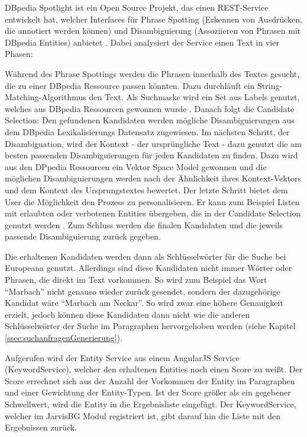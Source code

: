   DBpedia Spotlight ist ein Open Source Projekt, das einen REST-Service entwickelt hat, welcher Interfaces für Phrase Spotting (Erkennen von Ausdrücken, die annotiert werden können) und Disambiguierung (Assoziieren von Phrasen mit DBpedia Entities) anbietet \cite{daiber2013improving}. Dabei analysiert der Service einen Text in vier Phasen:

  Während des Phrase Spottings werden die Phrasen innerhalb des Textes gesucht, die zu einer DBpedia Ressource passen könnten. Dazu durchläuft ein String-Matching-Algorithmus den Text. Als Suchmaske wird ein Set aus Labels genutzt, welches aus DBpedia Ressourcen gewonnen wurde \cite{mendes2011dbpedia}. Danach folgt die Candidate Selection: Den gefundenen Kandidaten werden mögliche Disambiguierungen aus dem DBpedia Lexikalisierungs Datensatz zugewiesen. Im nächsten Schritt, der Disambiguation, wird der Kontext - der ursprüngliche Text - dazu genutzt die am besten passenden Disambiguierungen für jeden Kandidaten zu finden. Dazu wird aus den DPpedia Ressourcen ein Vektor Space Model gewonnen und die möglichen Disambiguierungen werden nach der Ähnlichkeit ihres Kontext-Vektors und dem Kontext des Ursprungstextes bewertet. Der letzte Schritt bietet dem User die Möglichkeit den Prozess zu personalisieren. Er kann zum Beispiel Listen mit erlaubten oder verbotenen Entities übergeben, die in der Candidate Selection genutzt werden \cite{mendes2011dbpedia}. Zum Schluss werden die finalen Kandidaten und die jeweils passende Disambiguierung zurück gegeben. 

  Die erhaltenen Kandidaten werden dann als Schlüsselwörter für die Suche bei Europeana genutzt. Allerdings sind diese Kandidaten nicht immer Wörter oder Phrasen, die direkt im Text vorkommen. So wird zum Beispiel das Wort ``Marbach'' nicht genauso wieder zurück gesendet, sondern der dazugehörige Kandidat wäre ``Marbach am Neckar''. So wird zwar eine höhere Genauigkeit erzielt, jedoch können diese Kandidaten dann nicht wie die anderen Schlüsselwörter der Suche im Paragraphen hervorgehoben werden (siehe Kapitel \ref{ssec:suchanfragenGenerierung}).
 
  Aufgerufen wird der Entity Service aus einem AngularJS Service (KeywordService), welcher den erhaltenen Entities noch einen Score zu weißt. Der Score errechnet sich aus der Anzahl der Vorkommen der Entity im Paragraphen und einer Gewichtung der Entity-Typen. Ist der Score größer als ein gegebener Schwellwert, wird die Entity in die Ergebnisliste eingefügt. Der KeywordService, welcher im JarvisBG Modul registriert ist, gibt darauf hin die Liste mit den Ergebnissen zurück.

